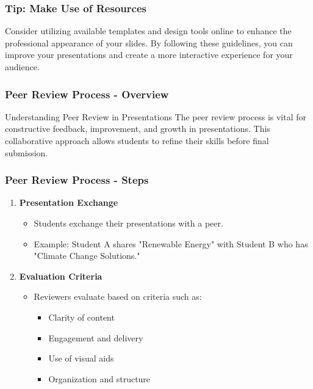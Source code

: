 \documentclass{beamer}
\begin{document}
\begin{frame}[fragile]
    \frametitle{Tip: Make Use of Resources}
    Consider utilizing available templates and design tools online to enhance the professional appearance of your slides. 
    By following these guidelines, you can improve your presentations and create a more interactive experience for your audience.
\end{frame}

\begin{frame}[fragile]
    \frametitle{Peer Review Process - Overview}
    \begin{block}{Understanding Peer Review in Presentations}
        The peer review process is vital for constructive feedback, improvement, and growth in presentations.
        This collaborative approach allows students to refine their skills before final submission.
    \end{block}
\end{frame}

\begin{frame}[fragile]
    \frametitle{Peer Review Process - Steps}
    \begin{enumerate}
        \item \textbf{Presentation Exchange}
        \begin{itemize}
            \item Students exchange their presentations with a peer.
            \item Example: Student A shares "Renewable Energy" with Student B who has "Climate Change Solutions."
        \end{itemize}

        \item \textbf{Evaluation Criteria}
        \begin{itemize}
            \item Reviewers evaluate based on criteria such as:
            \begin{itemize}
                \item Clarity of content
                \item Engagement and delivery
                \item Use of visual aids
                \item Organization and structure
            \end{itemize}
        \end{itemize}
    \end{enumerate}
\end{frame}
\end{document}

